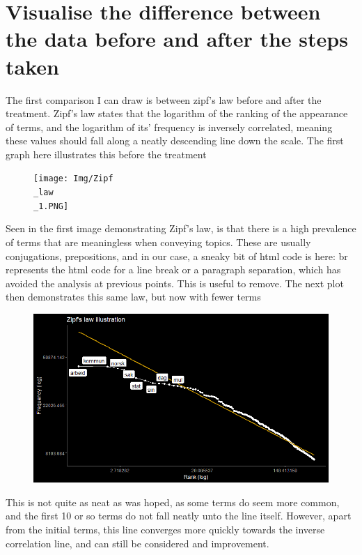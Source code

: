 \documentclass[12pt]{article}
\begin{document}
	\section{Visualise the difference between the data before and after the steps taken}
	
	The first comparison I can draw is between zipf's law before and after the treatment. Zipf's law states that the logarithm of the ranking of the appearance of terms, and the logarithm of its' frequency is inversely correlated, meaning these values should fall along a neatly descending line down the scale. The first graph here illustrates this before the treatment
	
	\begin{figure}[h]
		\texttt{[image: Img/Zipf\\\_law\\\_1.PNG]}
	\end{figure}
	
	Seen in the first image demonstrating Zipf's law, is that there is a high prevalence of terms that are meaningless when conveying topics. These are usually conjugations, prepositions, and in our case, a sneaky bit of html code is here: br represents the html code for a line break or a paragraph separation, which has avoided the analysis at previous points. This is useful to remove. The next plot then demonstrates this same law, but now with fewer terms
	
	\begin{figure}[h]
		\includegraphics[scale=0.60]{Img/ziplaw2.PNG}
	\end{figure}
	
	This is not quite as neat as was hoped, as some terms do seem more common, and the first 10 or so terms do not fall neatly unto the line itself. However, apart from the initial terms, this line converges more quickly towards the inverse correlation line, and can still be considered and improvement.
	
\end{document}
